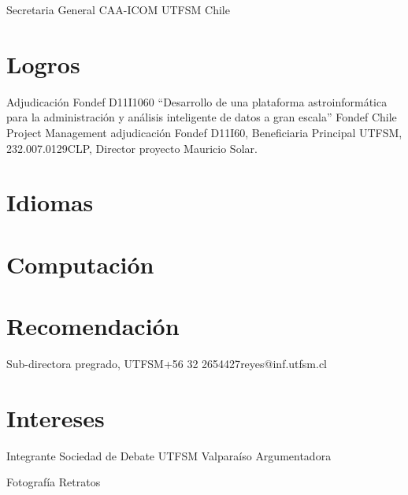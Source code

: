 \documentclass[letter,10pt]{moderncv}
\makeatletter
\renewcommand*{\bibliographyitemlabel}{\@biblabel{\arabic{enumiv}}}
\makeatother
\begin{document}
        {Secretaria General}
        {CAA-ICOM}
        {UTFSM}
        {Chile}
        {}


\section{Logros}

        {Adjudicación Fondef D11I1060 “Desarrollo de una plataforma astroinformática para la administración y análisis inteligente de datos a gran escala”}
        {Fondef}
        {}
        {Chile}
        {Project Management adjudicación Fondef D11I60, Beneficiaria Principal UTFSM, 232.007.0129CLP, Director proyecto Mauricio Solar.}%

\section{Idiomas}



\section{Computaci\'on}


\section{Recomendación}

        {Sub-directora pregrado, UTFSM}{+56 32 2654427}{reyes@inf.utfsm.cl}{}

\section{Intereses}

        {Integrante Sociedad de Debate}
        {}
        {UTFSM}
        {Valparaíso}
        {Argumentadora}

        {Fotografía}
        {}
        {}
        {}
        {Retratos}


%                                                            
\end{document}

